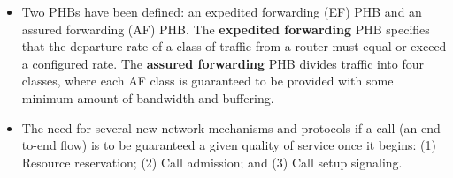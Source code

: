 \begin{itemize}
\item
Two PHBs have been defined: an expedited forwarding (EF) PHB and an assured forwarding (AF) PHB. The \textbf{expedited forwarding} PHB specifies that the departure rate of a class of traffic from a router must equal or exceed a configured rate. The \textbf{assured forwarding} PHB divides traffic into four classes, where each AF class is guaranteed to be provided with some minimum amount of bandwidth and buffering.

\item
The need for several new network mechanisms and protocols if a call (an end-to-end flow) is to be guaranteed a given quality of service once it begins: (1) Resource reservation; (2) Call admission; and (3) Call setup signaling.

\end{itemize}